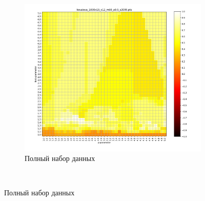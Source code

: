 \documentclass[12pt,twoside,a4paper,tikz,border=5]{refart}
\begin{document}
	
	\newpage
	\begin{figure}[t!]
		\centering
		\begin{subfigure}[t]{1\textwidth}
			\centering
			\includegraphics[width=1\linewidth, trim=1.4cm 1cm 2cm 0.5cm, clip]{img/ari/12/kovaleva_1000x15_c12_m60_a0.5_s2095/kovaleva_1000x15_c12_m60_a0.5_s2095.png}
			\caption{Полный набор данных}
			\label{fig:ari-1000}
		\end{subfigure}%
		~ 	
		

\end{figure}
\end{document}
